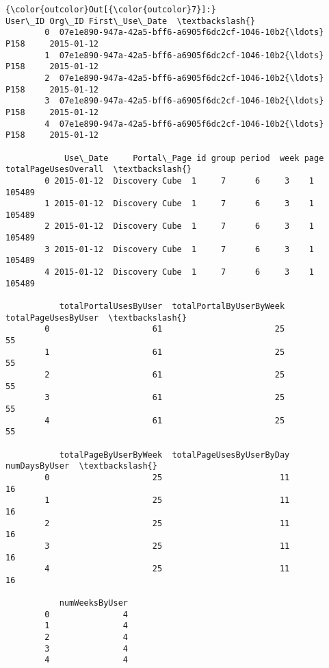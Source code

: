 \documentclass[11pt]{article}
\begin{document}
\begin{Verbatim}[commandchars=\\\{\}]
{\color{outcolor}Out[{\color{outcolor}7}]:}                                              User\_ID Org\_ID First\_Use\_Date  \textbackslash{}
        0  07e1e890-947a-42a5-bff6-a6905f6dc2cf-1046-10b2{\ldots}   P158     2015-01-12   
        1  07e1e890-947a-42a5-bff6-a6905f6dc2cf-1046-10b2{\ldots}   P158     2015-01-12   
        2  07e1e890-947a-42a5-bff6-a6905f6dc2cf-1046-10b2{\ldots}   P158     2015-01-12   
        3  07e1e890-947a-42a5-bff6-a6905f6dc2cf-1046-10b2{\ldots}   P158     2015-01-12   
        4  07e1e890-947a-42a5-bff6-a6905f6dc2cf-1046-10b2{\ldots}   P158     2015-01-12   
        
            Use\_Date     Portal\_Page id group period  week page  totalPageUsesOverall  \textbackslash{}
        0 2015-01-12  Discovery Cube  1     7      6     3    1                105489   
        1 2015-01-12  Discovery Cube  1     7      6     3    1                105489   
        2 2015-01-12  Discovery Cube  1     7      6     3    1                105489   
        3 2015-01-12  Discovery Cube  1     7      6     3    1                105489   
        4 2015-01-12  Discovery Cube  1     7      6     3    1                105489   
        
           totalPortalUsesByUser  totalPortalByUserByWeek  totalPageUsesByUser  \textbackslash{}
        0                     61                       25                   55   
        1                     61                       25                   55   
        2                     61                       25                   55   
        3                     61                       25                   55   
        4                     61                       25                   55   
        
           totalPageByUserByWeek  totalPageUsesByUserByDay  numDaysByUser  \textbackslash{}
        0                     25                        11             16   
        1                     25                        11             16   
        2                     25                        11             16   
        3                     25                        11             16   
        4                     25                        11             16   
        
           numWeeksByUser  
        0               4  
        1               4  
        2               4  
        3               4  
        4               4  
\end{Verbatim}
            
\end{document}
